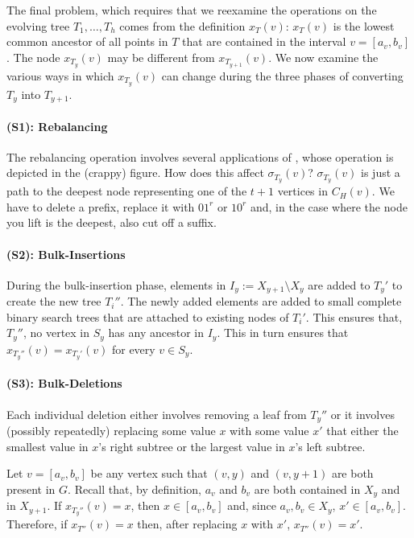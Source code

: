 \documentclass[kpfonts]{patmorin}
\begin{document}
The final problem, which requires that we reexamine the operations on the evolving tree $T_1,\ldots,T_h$ comes from the definition $x_T(v)$: $x_T(v)$ is the lowest common ancestor of all points in $T$ that are contained in the interval $v=[a_v,b_v]$.   The node $x_{T_y}(v)$ may be different from $x_{T_{y+1}}(v)$.  We now examine the various ways in which $x_{T_y}(v)$ can change during the three phases of converting $T_{y}$ into $T_{y+1}$.

\paragraph{(S1): Rebalancing}

The rebalancing operation involves several applications of , whose operation is depicted in the (crappy) figure. How does this affect $\sigma_{T_y}(v)$?  $\sigma_{T_y}(v)$ is just a path to the deepest node representing one of the $t+1$ vertices in $C_H(v)$.  We have to delete a prefix, replace it with $01^r$ or $10^r$ and, in the case where the node you lift is the deepest, also cut off a suffix.





\paragraph{(S2): Bulk-Insertions}

During the bulk-insertion phase, elements in $I_y:=X_{y+1}\setminus X_y$ are added to $T_y'$ to create the new tree $T_{i}''$.  The newly added elements are added to small complete binary search trees that are attached to existing nodes of $T_{i}'$.  This ensures that, $T_y''$, no vertex in $S_y$ has any ancestor in $I_y$.  This in turn ensures that $x_{T_y''}(v)=x_{T_y'}(v)$ for every $v\in S_y$.

\paragraph{(S3): Bulk-Deletions}

Each individual deletion either involves removing a leaf from $T_y''$ or it involves (possibly repeatedly) replacing some value $x$ with some value $x'$ that either the smallest value in $x$'s right subtree or the largest value in $x$'s left subtree.

Let $v=[a_v,b_v]$ be any vertex such that $(v,y)$ and $(v,y+1)$ are both present in $G$.  Recall that, by definition, $a_v$ and $b_v$ are both contained in $X_y$ and in $X_{y+1}$.  If $x_{T_y''}(v)=x$, then $x\in[a_v,b_v]$ and, since $a_v,b_v\in X_{y}$, $x'\in[a_v,b_v]$.  Therefore, if $x_{T''}(v)=x$ then, after replacing $x$ with $x'$, $x_{T''}(v)=x'$.  
\end{document}
